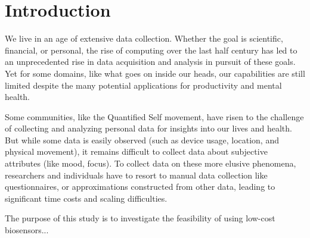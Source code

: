 \chapter{Introduction}




We live in an age of extensive data collection. Whether the goal is scientific, financial, or personal, the rise of computing over the last half century has led to an unprecedented rise in data acquisition and analysis in pursuit of these goals. Yet for some domains, like what goes on inside our heads, our capabilities are still limited despite the many potential applications for productivity and mental health.






Some communities, like the Quantified Self movement, have risen to the challenge of collecting and analyzing personal data for insights into our lives and health. But while some data is easily observed (such as device usage, location, and physical movement), it remains difficult to collect data about subjective attributes (like mood, focus). To collect data on these more elusive phenomena, researchers and individuals have to resort to manual data collection like questionnaires, or approximations constructed from other data, leading to significant time costs and scaling difficulties.\cite{malhi_promise_2017}

The purpose of this study is to investigate the feasibility of using low-cost biosensors...


